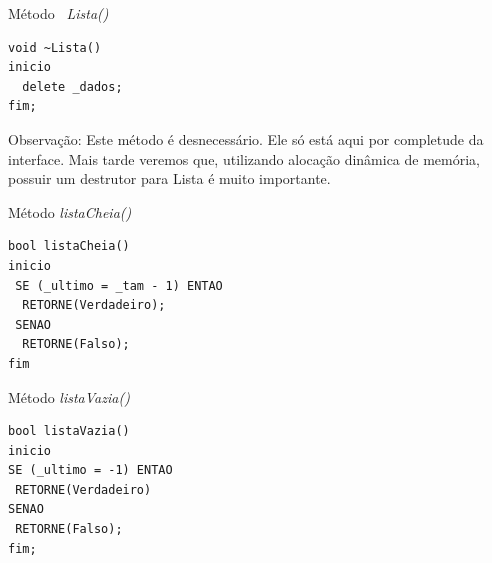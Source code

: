 \documentclass[12pt,table,xcolor={dvipsnames}]{beamer}
\begin{document}
\begin{frame}[fragile]{Método \textit{~Lista()}}
\begin{lstlisting}
void ~Lista()
inicio
  delete _dados;
fim;
\end{lstlisting}
\begin{block}{Observação:}
Este método é desnecessário. Ele só está aqui por completude da interface. Mais tarde veremos que, utilizando alocação dinâmica de memória, possuir um destrutor para  Lista é muito importante.
\end{block}
\end{frame}


\begin{frame}[fragile]{Método \textit{listaCheia()}}
\begin{lstlisting}
bool listaCheia()
inicio
 SE (_ultimo = _tam - 1) ENTAO
  RETORNE(Verdadeiro);
 SENAO
  RETORNE(Falso);
fim
\end{lstlisting}
\end{frame}

\begin{frame}[fragile]{Método \textit{listaVazia()}}
\begin{lstlisting}
bool listaVazia()
inicio
SE (_ultimo = -1) ENTAO
 RETORNE(Verdadeiro)
SENAO
 RETORNE(Falso);
fim;
\end{lstlisting}
\end{frame}
\end{document}
